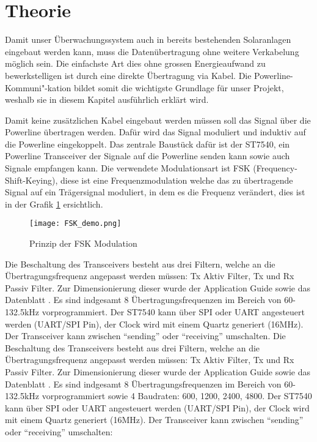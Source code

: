 \section{Theorie}

Damit unser Überwachungssystem auch in bereits bestehenden Solaranlagen eingebaut werden kann, muss die Datenübertragung ohne weitere Verkabelung möglich sein. Die einfachste Art dies ohne grossen Energieaufwand zu bewerkstelligen ist durch eine direkte Übertragung via Kabel. Die Powerline-Kommuni"-kation bildet somit die wichtigste Grundlage für unser Projekt, weshalb sie in diesem Kapitel ausführlich erklärt wird. 


Damit keine zusätzlichen Kabel eingebaut werden müssen soll das Signal über die Powerline übertragen werden. Dafür wird das Signal moduliert und induktiv auf die Powerline eingekoppelt. Das zentrale Baustück dafür ist der ST7540, ein Powerline Transceiver der Signale auf die Powerline senden kann sowie auch Signale empfangen kann. Die verwendete Modulationsart ist FSK (Frequency-Shift-Keying), diese ist eine Frequenzmodulation welche das zu übertragende Signal auf ein Trägersignal moduliert, in dem es die Frequenz verändert, dies ist in der Grafik \ref{fig::fskDemo} ersichtlich.

\begin{figure}[h]
\centering
\texttt{[image: FSK\_demo.png]}%
\caption{Prinzip der FSK Modulation \cite{fskDemo_wiki} }
\label{fig::fskDemo}
\end{figure}

Die Beschaltung des Transceivers besteht aus drei Filtern, welche an die Übertragungsfrequenz angepasst werden müssen: Tx Aktiv Filter, Tx und Rx Passiv Filter. Zur Dimensionierung dieser wurde der Application Guide \cite{Applic_Guide_ST7540} sowie das Datenblatt \cite{Datasheet_ST7540}. Es sind indgesamt 8 Übertragungsfrequenzen im Bereich von 60-132.5kHz vorprogrammiert. Der ST7540 kann über SPI oder UART angesteuert werden (UART/SPI Pin), der Clock wird mit einem Quartz generiert (16MHz). Der Transceiver kann zwischen ``sending'' oder ``receiving'' umschalten.
Die Beschaltung des Transceivers besteht aus drei Filtern, welche an die Übertragungsfrequenz angepasst werden müssen: Tx Aktiv Filter, Tx und Rx Passiv Filter. Zur Dimensionierung dieser wurde der Application Guide \cite{Applic_Guide_ST7540} sowie das Datenblatt \cite{Datasheet_ST7540}. Es sind indgesamt 8 Übertragungsfrequenzen im Bereich von 60-132.5kHz vorprogrammiert sowie 4 Baudraten: 600, 1200, 2400, 4800. Der ST7540 kann über SPI oder UART angesteuert werden (UART/SPI Pin), der Clock wird mit einem Quartz generiert (16MHz). Der Transceiver kann zwischen ``sending'' oder ``receiving'' umschalten:

